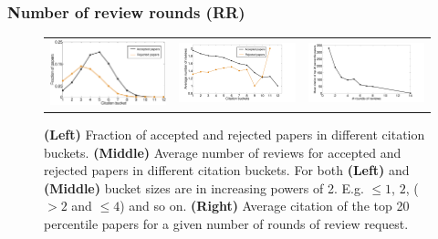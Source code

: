 \subsubsection{Number of review rounds (RR)}

 \begin{figure}[htpb]
 \centering
 \begin{tabular}{ccc}
 \includegraphics[scale=0.15]{figures/citation_bucket_frac_paper} & \includegraphics[scale=0.15]{figures/citation_bucket_reviews_all-eps-converted-to.pdf} & \includegraphics[scale=0.15]{figures/cit_rnd_rev-eps-converted-to.pdf}
 \end{tabular}
  \caption{{\bf (Left)} Fraction of accepted and rejected papers in different citation buckets. {\bf (Middle)} Average number of reviews for accepted and rejected papers in different citation buckets. For both {\bf (Left)} and {\bf(Middle) } bucket sizes are in increasing powers of 2. E.g. $\leq 1$, $2$, ($>2$ and $\leq 4$) and so on. {\bf (Right)} Average citation of the top 20 percentile  papers for a given number of rounds of review request.}
   \label{fig4}
 \end{figure}


